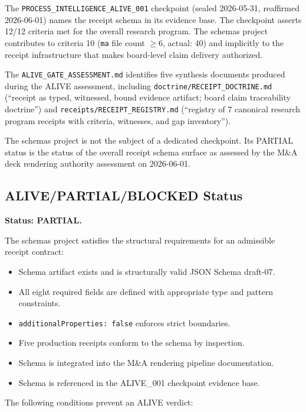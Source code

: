 The \texttt{PROCESS\_INTELLIGENCE\_ALIVE\_001} checkpoint (sealed 2026-05-31, reaffirmed 2026-06-01)
names the receipt schema in its evidence base. The checkpoint asserts 12/12 criteria met for the
overall research program. The schemas project contributes to criteria 10 (\texttt{ma} file count
$\ge 6$, actual: 40) and implicitly to the receipt infrastructure that makes board-level claim
delivery authorized.

The \texttt{ALIVE\_GATE\_ASSESSMENT.md} identifies five synthesis documents produced during the
ALIVE assessment, including \texttt{doctrine/RECEIPT\_DOCTRINE.md} (``receipt as typed, witnessed,
bound evidence artifact; board claim traceability doctrine'') and \texttt{receipts/RECEIPT\_REGISTRY.md}
(``registry of 7 canonical research program receipts with criteria, witnesses, and gap inventory'').

The schemas project is not the subject of a dedicated checkpoint. Its PARTIAL status is the
status of the overall receipt schema surface as assessed by the M\&A deck rendering authority
assessment on 2026-06-01.

\subsection{ALIVE/PARTIAL/BLOCKED Status}
\label{sec:schemas-evidence-status}

\textbf{Status: PARTIAL.}

The schemas project satisfies the structural requirements for an admissible receipt contract:

\begin{itemize}
  \item[$\checkmark$] Schema artifact exists and is structurally valid JSON Schema draft-07.
  \item[$\checkmark$] All eight required fields are defined with appropriate type and pattern constraints.
  \item[$\checkmark$] \texttt{additionalProperties: false} enforces strict boundaries.
  \item[$\checkmark$] Five production receipts conform to the schema by inspection.
  \item[$\checkmark$] Schema is integrated into the M\&A rendering pipeline documentation.
  \item[$\checkmark$] Schema is referenced in the ALIVE\_001 checkpoint evidence base.
\end{itemize}

The following conditions prevent an ALIVE verdict:

